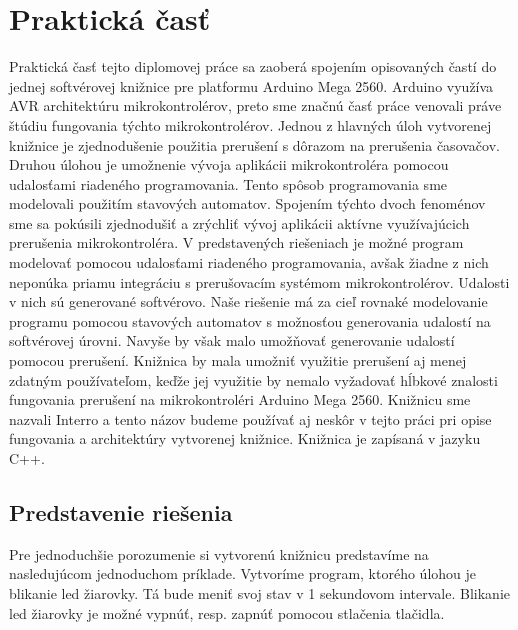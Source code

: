 \section{Praktická časť}
\noindent \par
Praktická časť tejto diplomovej práce sa zaoberá spojením opisovaných častí do jednej softvérovej knižnice pre platformu Arduino Mega 2560. Arduino využíva AVR
architektúru mikrokontrolérov, preto sme značnú časť práce venovali práve štúdiu fungovania týchto mikrokontrolérov.
Jednou z hlavných úloh vytvorenej knižnice je zjednodušenie použitia prerušení s dôrazom na prerušenia časovačov.
Druhou úlohou je umožnenie vývoja aplikácii mikrokontroléra pomocou udalosťami riadeného programovania. Tento spôsob programovania sme modelovali použitím stavových
automatov. Spojením týchto dvoch fenoménov sme sa pokúsili zjednodušiť a zrýchliť vývoj aplikácii aktívne využívajúcich prerušenia mikrokontroléra.
V predstavených riešeniach je možné program modelovať pomocou udalosťami riadeného programovania,
avšak žiadne z nich neponúka priamu integráciu s prerušovacím systémom mikrokontrolérov. Udalosti v nich sú generované softvérovo. Naše riešenie má za cieľ rovnaké
modelovanie programu pomocou stavových automatov s možnosťou generovania udalostí na softvérovej úrovni. Navyše by však malo umožňovať generovanie udalostí pomocou
prerušení. Knižnica by mala umožniť využitie  prerušení aj menej zdatným používateľom, keďže jej využitie by nemalo vyžadovať hĺbkové znalosti fungovania prerušení na mikrokontroléri Arduino Mega 2560.
Knižnicu sme nazvali Interro a tento názov budeme používať aj neskôr v tejto práci pri opise fungovania a architektúry vytvorenej knižnice. Knižnica je zapísaná v jazyku C++.

\subsection{Predstavenie riešenia}
\noindent \par
Pre jednoduchšie porozumenie si vytvorenú knižnicu predstavíme na nasledujúcom jednoduchom príklade. Vytvoríme program, ktorého úlohou je blikanie led žiarovky.
Tá bude meniť svoj stav v 1 sekundovom intervale. Blikanie led žiarovky je možné vypnúť, resp. zapnúť pomocou stlačenia tlačidla.

